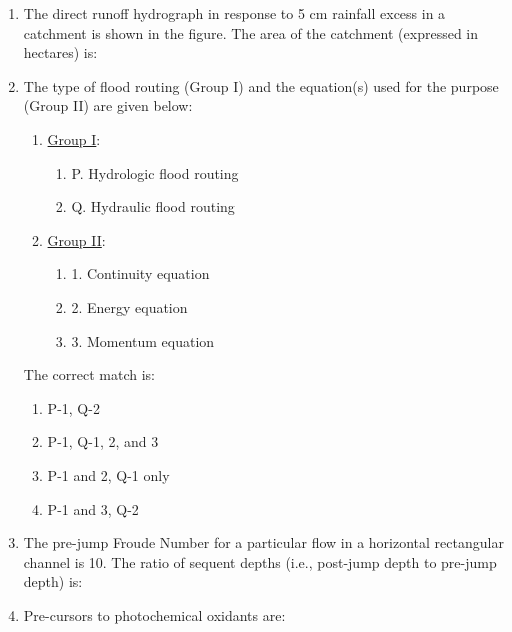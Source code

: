 \documentclass[journal]{IEEEtran}
\begin{document}
\begin{enumerate}
    \item The direct runoff hydrograph in response to 5 cm rainfall excess in a catchment is shown in the figure. The area of the catchment (expressed in hectares) is:\\
      \begin{figure}[H]
        \centering
         
    \end{figure}
    \item The type of flood routing (Group I) and the equation(s) used for the purpose (Group II) are given below:
    \begin{multicols}{2}
        \begin{enumerate}
            \item \underline{Group I}: 
                \begin{enumerate}
                    \item P. Hydrologic flood routing
                    \item Q. Hydraulic flood routing
                \end{enumerate}
            \item \underline{Group II}:
                \begin{enumerate}
                    \item 1. Continuity equation
                    \item 2. Energy equation
                    \item 3. Momentum equation
                \end{enumerate}
        \end{enumerate}
                \end{multicols}
    The correct match is:
    \begin{multicols}{2}
        \begin{enumerate}
            \item  P-1, Q-2
            \item  P-1, Q-1, 2, and 3
            \item  P-1 and 2, Q-1 only
            \item  P-1 and 3, Q-2
        \end{enumerate}
        \end{multicols}
    \item The pre-jump Froude Number for a particular flow in a horizontal rectangular channel is 10. The ratio of sequent depths (i.e., post-jump depth to pre-jump depth) is:
    \item Pre-cursors to photochemical oxidants are:

\end{enumerate}
\end{document}
